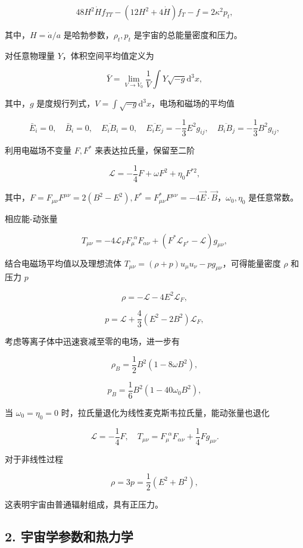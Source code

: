 \documentclass[aps,prl,preprint,groupedaddress]{revtex4-2}
\begin{document}
$$
48H^2\dot{H} f_{TT} - \left(12 H^2 + 4\dot{H} \right) f_T - f= 2\kappa^2 p_t,
$$

其中，$H=\dot{a}/a$ 是哈勃参数，$\rho_t,p_t$ 是宇宙的总能量密度和压力。

对任意物理量 $Y$，体积空间平均值定义为

$$
\bar{Y}
=\lim_{V\to V_0} \frac{1 }{V } \int Y\sqrt{-g} \mathrm{d}^3 x,
$$

其中，$g$ 是度规行列式，$\displaystyle{V=\int\sqrt{-g}\mathrm{d}^3 x } $，电场和磁场的平均值

$$
\bar{E}_i = 0,\quad
\bar{B}_i = 0,\quad
\overline{E_i B_i} = 0,\quad
\overline{E_i E_j} = -\frac{1 }{3 } E^2 g_{ij},\quad
\overline{B_i B_j} = -\frac{1 }{3 } B^2 g_{ij},
$$

利用电磁场不变量 $F,F^*$ 来表达拉氏量，保留至二阶

$$
\mathcal{L}=-\frac{1 }{4 } F + \omega F^2 + \eta_0 F^{*2},
$$

其中，$F=F_{\mu\nu} F^{\mu\nu}=2(B^2-E^2),F^*=F_{\mu\nu}^*F^{\mu\nu}=-4\vec{E}\cdot\vec{B}$，$\omega_0,\eta_0$ 是任意常数。

相应能-动张量

$$
T_{\mu\nu}
=-4\mathcal{L}_F F_\mu^{~~\alpha} F_{\alpha\nu} + \left(F^* \mathcal{L}_{F^*} - \mathcal{L} \right) g_{\mu\nu},
$$

结合电磁场平均值以及理想流体 $T_{\mu\nu}=(\rho+p)u_\mu u_\nu-p g_{\mu\nu}$，可得能量密度 $\rho$ 和压力 $p$

$$
\rho = -\mathcal{L} - 4E^2 \mathcal{L}_F,
$$

$$
p = \mathcal{L} + \frac{4 }{3 } \left(E^2-2B^2 \right)\mathcal{L}_F,
$$

考虑等离子体中迅速衰减至零的电场，进一步有

$$
\rho_B = \frac{1 }{2 } B^2\left(1-8\omega B^2 \right),
$$


$$
p_B = \frac{1 }{6 } B^2 \left(1-40\omega_0 B^2 \right),
$$

当 $\omega_0=\eta_0=0$ 时，拉氏量退化为线性麦克斯韦拉氏量，能动张量也退化

$$
\mathcal{L} = -\frac{1 }{4 } F,\quad
T_{\mu\nu} = F_\mu^{~~\alpha} F_{\alpha\nu} + \frac{1 }{4 } F g_{\mu\nu}.
$$

对于非线性过程

$$
\rho = 3p = \frac{1 }{2 } \left(E^2 + B^2 \right),
$$

这表明宇宙由普通辐射组成，具有正压力。

\subsection{2. 宇宙学参数和热力学}
\end{document}
